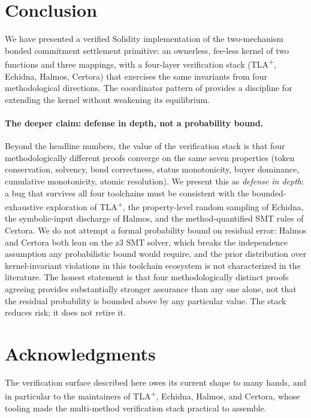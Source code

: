 \documentclass[11pt,a4paper]{article}
\theoremstyle{definition}
\theoremstyle{remark}
\begin{document}
\section{Conclusion}
\label{sec:conclusion}

We have presented a verified Solidity implementation of the
two-mechanism bonded commitment settlement primitive: an ownerless,
fee-less kernel of two functions and three mappings, with a
four-layer verification stack (TLA\textsuperscript{+}, Echidna,
Halmos, Certora) that exercises the same invariants from four
methodological directions. The coordinator pattern of
 provides a discipline for extending the
kernel without weakening its equilibrium.

\paragraph{The deeper claim: defense in depth, not a probability bound.}
Beyond the headline numbers, the value of the verification stack
is that four methodologically different proofs converge on the
same seven properties (token conservation, solvency, bond
correctness, status monotonicity, buyer dominance, cumulative
monotonicity, atomic resolution). We present this as
\emph{defense in depth}: a bug that survives all four toolchains
must be consistent with the bounded-exhaustive exploration of
TLA\textsuperscript{+}, the property-level random sampling of
Echidna, the symbolic-input discharge of Halmos, and the
method-quantified SMT rules of Certora. We do not attempt a
formal probability bound on residual error: Halmos and Certora
both lean on the z3 SMT solver, which breaks the independence
assumption any probabilistic bound would require, and the prior
distribution over kernel-invariant violations in this toolchain
ecosystem is not characterized in the literature. The honest
statement is that four methodologically distinct proofs agreeing
provides substantially stronger assurance than any one alone, not
that the residual probability is bounded above by any particular
value. The stack reduces risk; it does not retire it.

\section*{Acknowledgments}
The verification surface described here owes its current shape to
many hands, and in particular to the maintainers of
TLA\textsuperscript{+}, Echidna, Halmos, and Certora, whose tooling
made the multi-method verification stack practical to assemble.
\end{document}
